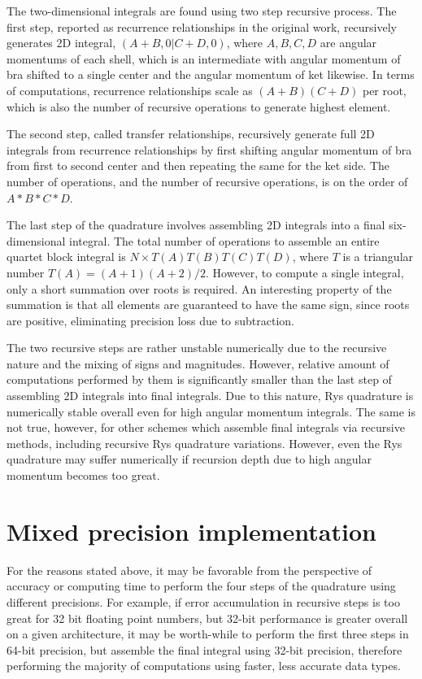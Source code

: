 \documentclass[12pt]{article}
\begin{document}
The two-dimensional integrals are found using two step recursive process.
The first step, reported as recurrence relationships in the original work,  recursively generates 2D integral, $(A+B, 0| C+D, 0)$, where $A, B, C, D$ are angular momentums
 of each shell, which is an intermediate 
with angular momentum of bra shifted to a single center and the angular momentum of ket likewise.  
In terms of computations, recurrence relationships scale as $(A+B)(C+D)$ per root, which is also the number of recursive operations to generate highest element. 

The second step, called transfer relationships, recursively generate full 2D integrals from recurrence relationships by first shifting angular momentum of bra from first to second center
and then repeating the same for the ket side.  The number of operations,
 and the number of recursive operations, is on the order of $A*B*C*D$.  

The last step of the quadrature involves assembling 2D integrals into a final
six-dimensional integral.
 The total number of operations to assemble an entire quartet block integral
is $N \times T(A) T(B) T(C) T(D)$, where $T $ is a triangular number
 $T(A) = (A+1)(A+2)/2$.
However, to compute a single integral, only a short summation over roots is required. 
An interesting property of the summation is that all elements are guaranteed to have the same sign, since roots are positive, eliminating precision loss due to subtraction. 

The two recursive steps are rather unstable numerically due to the recursive nature and the mixing of signs and magnitudes.  However, relative amount of computations performed
by them is significantly smaller than the last step of assembling 2D integrals into final integrals.  Due to this nature, Rys quadrature is numerically stable overall
even for high angular momentum integrals.  The same is not true, however, 
for other schemes \cite{lindh1991reduced} which assemble final integrals via recursive methods,
including recursive Rys quadrature variations.
However, even the Rys quadrature may suffer numerically if recursion depth due to high angular momentum becomes too great. 


\section{Mixed precision implementation}
For the reasons stated above, it may be favorable from the perspective of accuracy or computing time to perform the four steps of the quadrature using different precisions. 
For example, if error accumulation in recursive steps is too great for 32 bit floating point numbers, but 32-bit performance is greater overall on a given architecture, it may be
worth-while to perform the first three steps in 64-bit precision, but assemble the final integral using 32-bit precision, therefore performing the majority of computations using faster,
less accurate data types. 
\end{document}
